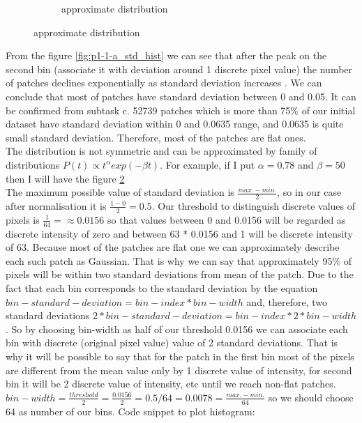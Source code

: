 \documentclass{article}
\begin{document}
\begin{enumerate}[label=(\alph*)]
\begin{figure}[t]
\begin{subfigure}{0.5\textwidth}
				 			\caption{approximate distribution}
				 			\label{fig:p1-1-a_dist}
				 		\end{subfigure}%
				 	\end{figure}
				 	From the figure \ref{fig:p1-1-a_std_hist} we can see that after the peak on the second bin (associate it with deviation around 1 discrete pixel value) the number of patches declines exponentially as  standard deviation increases . We can conclude that most of patches have standard deviation between 0 and 0.05. It can be confirmed from subtask c. 52739 patches which is more than 75\% of our initial dataset have standard deviation within 0 and 0.0635 range, and 0.0635 is quite small standard deviation. Therefore, most of the patches are flat ones. \\
				 	The distribution is not symmetric and can be approximated by family of distributions $P(t) \propto t^{\alpha} exp(-\beta t)$. For example, if I put $\alpha = 0.78$ and $\beta = 50$ then I will have the figure \ref{fig:p1-1-a_dist}\\
				 	The maximum possible value of standard deviation is $\frac{max. - min.}{2}$, so in our case after normalisation it is $\frac{1 - 0}{2}= 0.5$. Our threshold to distinguish discrete values of pixels is $\frac{1}{64} = \approx 0.0156$ so that values between 0 and 0.0156 will be regarded as discrete intensity of zero and between 63 * 0.0156 and 1 will be discrete intensity of 63. Because most of the patches are flat one we can approximately describe each such patch as Gaussian. That is why we can say that approximately 95\% of pixels will be within two standard deviations from mean of the patch. Due to the fact that each bin corresponds to the standard deviation by the equation $bin-standard-deviation = bin-index * bin-width$ and, therefore, two standard deviations $2 * bin-standard-deviation = bin-index * 2 * bin-width$. So by choosing bin-width as half of our threshold 0.0156 we can associate each bin with discrete (original pixel value) value of 2 standard deviations. That is why it will be possible to say that for the patch in the first bin most of the pixels are different from the mean value only by 1 discrete value of intensity, for second bin it will be 2 discrete value of intensity, etc until we reach non-flat patches. $bin-width = \frac{threshold} {2} = \frac{0.0156}{2} =0.5/64 = 0.0078 = \frac{max. - min.}{64}$   so we should choose 64 as number of our bins.
				 	Code snippet to plot histogram:
				 	
				 	

\end{enumerate}
\end{document}
